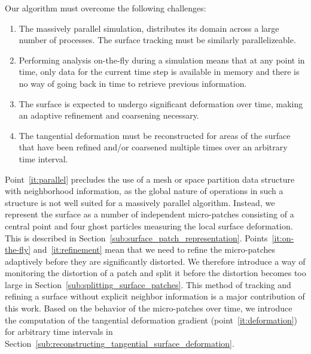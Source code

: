 %
Our algorithm must overcome the following challenges:
%
\begin{enumerate}
    \item \label{it:parallel}
        The massively parallel simulation, distributes its domain across a large
        number of processes. The surface tracking must be similarly
        parallelizeable.
    \item \label{it:on-the-fly}
        Performing analysis on-the-fly during a simulation means that at any
        point in time, only data for the current time step is available in
        memory and there is no way of going back in time to retrieve previous
        information.
    \item \label{it:refinement}
        The surface is expected to undergo significant deformation over time,
        making an adaptive refinement and coarsening necessary.
    \item \label{it:deformation}
        The tangential deformation must be reconstructed for areas of the
        surface that have been refined and/or coarsened multiple times over an
        arbitrary time interval.
\end{enumerate}
%
Point~\ref{it:parallel} precludes the use of a mesh or space partition data
structure with neighborhood information, as the global nature of operations in
such a structure is not well suited for a massively parallel algorithm.
%
Instead, we represent the surface as a number of independent micro-patches
consisting of a central point and four ghost particles measuring the local
surface deformation.
%
This is described in Section~\ref{sub:surface_patch_representation}.
%
Points~\ref{it:on-the-fly} and~\ref{it:refinement} mean that we need to refine
the micro-patches adaptively before they are significantly distorted.
%
We therefore introduce a way of monitoring the distortion of a patch and split
it before the distortion becomes too large in
Section~\ref{sub:splitting_surface_patches}.
%
This method of tracking and refining a surface without explicit neighbor
information is a major contribution of this work.
%
Based on the behavior of the micro-patches over time, we introduce the
computation of the tangential deformation gradient (point~\ref{it:deformation})
for arbitrary time intervals in
Section~\ref{sub:reconstructing_tangential_surface_deformation}.
%
